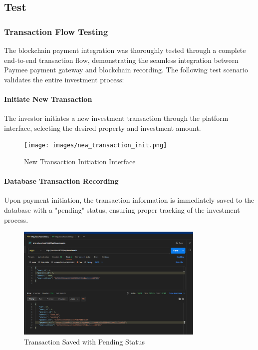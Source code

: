 \subsection{Test}
\subsubsection{Transaction Flow Testing}

The blockchain payment integration was thoroughly tested through a complete end-to-end transaction flow, demonstrating the seamless integration between Paymee payment gateway and blockchain recording. The following test scenario validates the entire investment process:

\paragraph{ Initiate New Transaction}
The investor initiates a new investment transaction through the platform interface, selecting the desired property and investment amount.
\newpage
\begin{figure}[htbp]
    \centering
    \texttt{[image: images/new\_transaction\_init.png]}
    \caption{New Transaction Initiation Interface}
    \label{fig:new-transaction-init}
\end{figure}


\paragraph{ Database Transaction Recording}
Upon payment initiation, the transaction information is immediately saved to the database with a "pending" status, ensuring proper tracking of the investment process.

\begin{figure}[htbp]
    \centering
    \includegraphics[width=0.8\textwidth]{images/transaction_pending_status.png}
    \caption{Transaction Saved with Pending Status}
    \label{fig:transaction-pending-status}
\end{figure}


